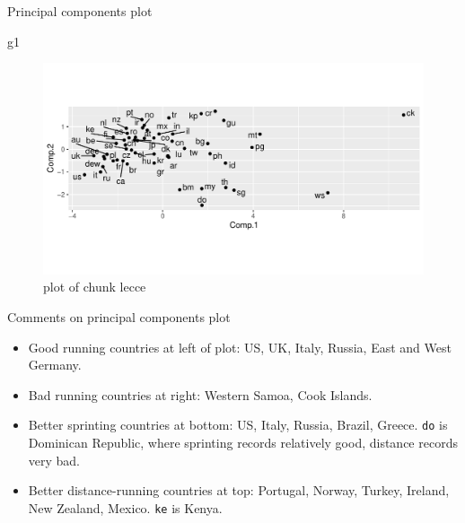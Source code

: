 \documentclass[ignorenonframetext,]{beamer}
\newenvironment{Shaded}{\begin{snugshade}}{\end{snugshade}}
\newcommand{\NormalTok}[1]{#1}
\begin{document}
\begin{frame}[fragile]{Principal components plot}
\protect\hypertarget{principal-components-plot}{}

\begin{Shaded}
\begin{Highlighting}[]
\NormalTok{g1}
\end{Highlighting}
\end{Shaded}

\begin{figure}
\centering
\includegraphics{figure/lecce-1.pdf}
\caption{plot of chunk lecce}
\end{figure}

\end{frame}

\begin{frame}[fragile]{Comments on principal components plot}
\protect\hypertarget{comments-on-principal-components-plot}{}

\begin{itemize}
\item
  Good running countries at left of plot: US, UK, Italy, Russia, East
  and West Germany.
\item
  Bad running countries at right: Western Samoa, Cook Islands.
\item
  Better sprinting countries at bottom: US, Italy, Russia, Brazil,
  Greece. \texttt{do} is Dominican Republic, where sprinting records
  relatively good, distance records very bad.
\item
  Better distance-running countries at top: Portugal, Norway, Turkey,
  Ireland, New Zealand, Mexico. \texttt{ke} is Kenya.
\end{itemize}

\end{frame}
\end{document}
